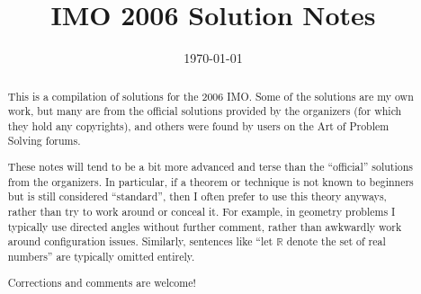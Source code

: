 \documentclass[11pt]{scrartcl}
\title{IMO 2006 Solution Notes}
\date{\today}
\begin{document}
\maketitle

\begin{abstract}
This is a compilation of solutions
for the 2006 IMO.
Some of the solutions are my own work,
but many are from the official solutions provided by the organizers
(for which they hold any copyrights),
and others were found by users on the Art of Problem Solving forums.

These notes will tend to be a bit more advanced and terse than the ``official''
solutions from the organizers.
In particular, if a theorem or technique is not known to beginners
but is still considered ``standard'', then I often prefer to
use this theory anyways, rather than try to work around or conceal it.
For example, in geometry problems I typically use directed angles
without further comment, rather than awkwardly work around configuration issues.
Similarly, sentences like ``let $\mathbb{R}$ denote the set of real numbers''
are typically omitted entirely.

Corrections and comments are welcome!
\end{abstract}

\tableofcontents
\newpage

\addtocounter{section}{-1}
\end{document}
